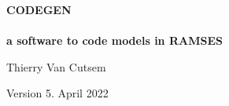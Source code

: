 \begin{center}

\vspace*{40ex}

{\huge \bf  CODEGEN \\ ~ \\

a software to code models in RAMSES}

\vspace*{15ex}

{\Large Thierry Van Cutsem}

\vspace*{30ex}

{\Large Version 5. April 2022}
\end{center}
